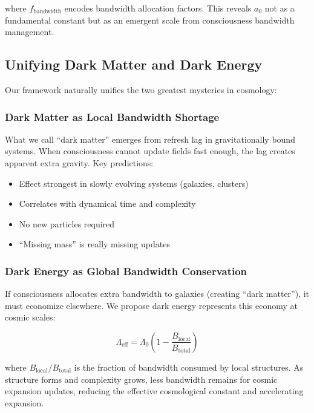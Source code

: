 \documentclass[twocolumn,prd,amsmath,amssymb,aps,superscriptaddress,nofootinbib]{revtex4-2}
\newcommand{\azero}{a_0}
\begin{document}
where $f_{\text{bandwidth}}$ encodes bandwidth allocation factors. This reveals $\azero$ not as a fundamental constant but as an emergent scale from consciousness bandwidth management.

\subsection{Unifying Dark Matter and Dark Energy}

Our framework naturally unifies the two greatest mysteries in cosmology:

\subsubsection{Dark Matter as Local Bandwidth Shortage}

What we call ``dark matter'' emerges from refresh lag in gravitationally bound systems. When consciousness cannot update fields fast enough, the lag creates apparent extra gravity. Key predictions:
\begin{itemize}
\item Effect strongest in slowly evolving systems (galaxies, clusters)
\item Correlates with dynamical time and complexity
\item No new particles required
\item ``Missing mass'' is really missing updates
\end{itemize}

\subsubsection{Dark Energy as Global Bandwidth Conservation}

If consciousness allocates extra bandwidth to galaxies (creating ``dark matter''), it must economize elsewhere. We propose dark energy represents this economy at cosmic scales:

\begin{equation}
\Lambda_{\text{eff}} = \Lambda_0 \left(1 - \frac{B_{\text{local}}}{B_{\text{total}}}\right)
\label{eq:dark_energy}
\end{equation}

where $B_{\text{local}}/B_{\text{total}}$ is the fraction of bandwidth consumed by local structures. As structure forms and complexity grows, less bandwidth remains for cosmic expansion updates, reducing the effective cosmological constant and accelerating expansion.
\end{document}
